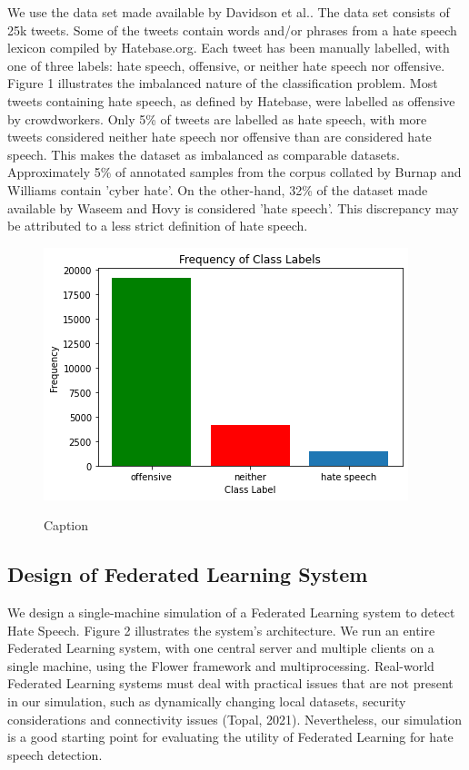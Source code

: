 \documentclass[letterpaper]{article} %
\begin{document}
We use the data set made available by Davidson et al.. The data set consists of 25k tweets. Some of the tweets contain words and/or phrases from a hate speech lexicon compiled by Hatebase.org. Each tweet has been manually labelled, with one of three labels: hate speech, offensive, or neither hate speech nor offensive. Figure 1 illustrates the imbalanced nature of the classification problem. Most tweets containing hate speech, as defined by Hatebase, were labelled as offensive by crowdworkers. Only 5\% of tweets are labelled as hate speech, with more tweets considered neither hate speech nor offensive than are considered hate speech. This makes the dataset as imbalanced as comparable datasets. Approximately 5\% of annotated samples from the corpus collated by Burnap and Williams contain 'cyber hate'. On the other-hand, 32\% of the dataset made available by Waseem and Hovy is considered 'hate speech'. This discrepancy may be attributed to a less strict definition of hate speech.

\begin{figure}[h]
{\includegraphics[width=\columnwidth]{Frequency_of_class_labels_in_population}}
\caption{Caption}
\end{figure}

\subsection{Design of Federated Learning System}

We design a single-machine simulation of a Federated Learning system to detect Hate Speech. Figure 2 illustrates the system's architecture. We run an entire Federated Learning system, with one central server and multiple clients on a single machine, using the Flower framework and multiprocessing. Real-world Federated Learning systems must deal with practical issues that are not present in our simulation, such as dynamically changing local datasets, security considerations and connectivity issues (Topal, 2021). Nevertheless, our simulation is a good starting point for evaluating the utility of Federated Learning for hate speech detection.
\end{document}
